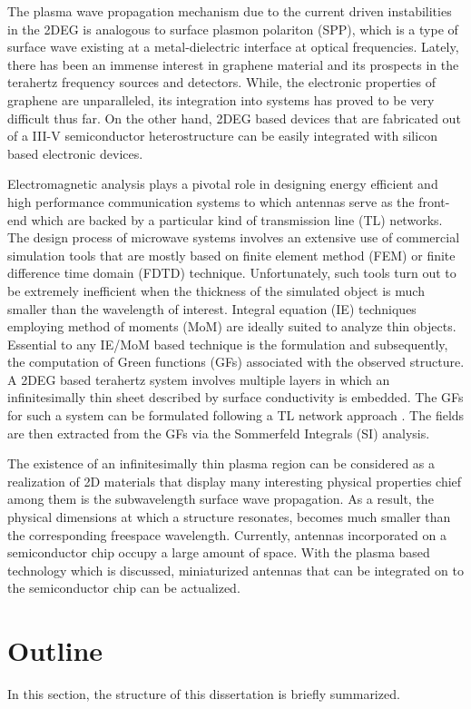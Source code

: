 The plasma wave propagation mechanism due to the current driven instabilities in the 2DEG is analogous to surface plasmon polariton (SPP), which is a type of surface wave existing at a metal-dielectric interface at optical frequencies. Lately, there has been an immense interest in graphene material and its prospects in the terahertz frequency sources and detectors. While, the electronic properties of graphene are unparalleled, its integration into systems has proved to be very difficult thus far. On the other hand, 2DEG based devices that are fabricated out of a III-V semiconductor heterostructure can be easily integrated with silicon based electronic devices.

Electromagnetic analysis plays a pivotal role in designing energy efficient and high performance communication systems to which antennas serve as the front-end which are backed by a particular kind of transmission line (TL) networks. The design process of microwave systems involves an extensive use of commercial simulation tools that are mostly based on finite element method (FEM) or finite difference time domain (FDTD) technique. Unfortunately, such tools turn out to be extremely inefficient when the thickness of the simulated object is much smaller than the wavelength of interest. Integral equation (IE) techniques employing method of moments (MoM) are ideally suited to analyze thin objects. Essential to any IE/MoM based technique is the formulation and subsequently, the computation of Green functions (GFs) associated with the observed structure. A 2DEG based terahertz system involves multiple layers in which an infinitesimally thin sheet described by surface conductivity is embedded. The GFs for such a system can be formulated following a TL network approach
\cite{Michalski1997}. The fields are then extracted from the GFs via the Sommerfeld Integrals (SI) analysis.

The existence of an infinitesimally thin plasma region can be considered as a realization of 2D materials that display many interesting physical properties chief among them is the subwavelength surface wave propagation. As a result, the physical dimensions at which a structure resonates, becomes much smaller than the corresponding freespace wavelength. Currently, antennas incorporated on a semiconductor chip occupy a large amount of space. With the plasma based technology which is discussed, miniaturized antennas that can be integrated on to the semiconductor chip can be actualized.
\section*{Outline}
%
In this section, the structure of this dissertation is briefly summarized.

